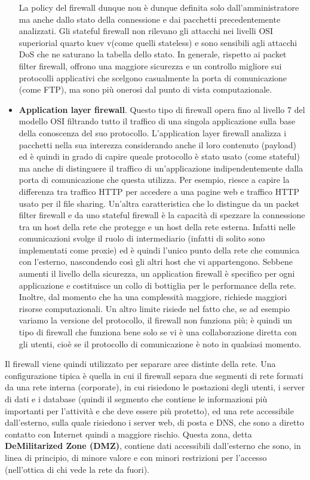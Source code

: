 \begin{itemize}
	La policy del firewall dunque non è  dunque definita solo dall'amministratore ma anche dallo stato della connessione e dai pacchetti precedentemente analizzati. Gli stateful firewall non rilevano gli attacchi nei livelli OSI superiorial quarto kuev v(come quelli stateless)  e sono sensibili agli attacchi DoS che ne saturano la tabella dello stato. In generale, rispetto ai packet filter firewall, offrono una maggiore sicurezza e un controllo migliore sui protocolli applicativi che scelgono casualmente la porta di comunicazione (come FTP), ma sono più onerosi dal punto di vista computazionale.
	\item \textbf{Application layer firewall}. Questo tipo di firewall opera fino al livello 7 del modello OSI filtrando tutto il traffico di una singola applicazione sulla base della conoscenza del suo protocollo. L'application layer firewall analizza i pacchetti nella sua interezza considerando anche il loro contenuto (payload) ed è quindi in grado di capire queale protocollo è stato usato (come stateful) ma anche di distinguere il traffico di un'applicazione indipendentemente dalla porta di comunicazione che questa utilizza. Per esempio, riesce a capire la differenza tra traffico HTTP per accedere a una pagine web e traffico HTTP usato per il file sharing. Un'altra caratteristica che lo distingue da un packet filter firewall e da uno stateful firewall è la capacità di spezzare la connessione tra un host della rete che protegge e un host della rete esterna. Infatti nelle comunicazioni svolge il ruolo di intermediario (infatti di solito sono implementati come proxie) ed è quindi l'unico punto della rete che comunica con l'esterno, nascondendo così gli altri host che vi appartengono. Sebbene aumenti il livello della sicurezza, un application firewall è specifico per ogni applicazione e costituisce un collo di bottiglia per le performance della rete. Inoltre, dal momento che ha una complessità maggiore, richiede maggiori risorse computazionali. Un altro limite risiede nel fatto che, se ad esempio variamo la versione del protocollo, il firewall non funziona più; è quindi un tipo di firewall che funziona bene solo se vi è una collaborazione diretta con gli utenti, cioè se il protocollo di comunicazione è noto in qualsiasi momento.
\end{itemize}
Il firewall viene quindi utilizzato per separare aree distinte della rete. Una configurazione tipica è quella in cui il firewall separa due segmenti di rete formati da una rete interna (corporate), in cui risiedono le postazioni degli utenti, i server di dati e i database (quindi il segmento che contiene le informazioni più importanti per l'attività e che deve essere più protetto), ed una rete accessibile dall'esterno, sulla quale risiedono i server web, di posta e DNS, che sono a diretto contatto con Internet quindi a maggiore rischio. Questa zona, detta \textbf{DeMilitarized Zone (DMZ)}, contiene dati accessibili dall'esterno che sono, in linea di principio, di minore valore e con minori restrizioni per l'accesso (nell'ottica di chi vede la rete da fuori).\newpage
